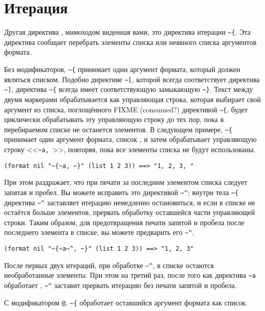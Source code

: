 \section{Итерация}

Другая директива , мимоходом виденная вами, это директива итерации
\lstinline!~{!. Эта директива сообщает  перебрать элементы списка или
  неявного списка аргументов формата.

Без модификаторов, \lstinline!~{! принимает один аргумент формата, который должен являться списком. Подобно директиве
\lstinline!~[!, которой всегда соответствует директива \lstinline!~]!, директива \lstinline!~{! всегда имеет соответствующую замыкающую
\lstinline!~}!. Текст между двумя маркерами обрабатывается как управляющая строка, которая выбирает свой аргумент из
списка, поглощённого FIXME (consumed?)  директивой \lstinline!~{!.  будет циклически обрабатывать эту
управляющую строку до тех пор, пока в перебираемом списке не останется элементов. В следующем примере, \lstinline!~{!
принимает один аргумент формата, список , и затем обрабатывает управляющую строку <<\lstinline!~a, !>>, повторяя,
пока все элементы списка не будут использованы.

\begin{lstlisting}[style=lisprepl]
  (format nil "~{~a, ~}" (list 1 2 3)) ==> "1, 2, 3, "
\end{lstlisting}

При этом раздражает, что при печати за последним элементом списка следует запятая и пробел. Вы можете исправить
это директивой \lstinline!~^!; внутри тела \lstinline!~{! директива \lstinline!~^! заставляет итерацию немедленно остановиться, и если в
списке не остаётся больше элементов, прервать обработку оставшейся части управляющей строки. Таким образом, для
предотвращения печати запятой и пробела после последнего элемента в списке, вы можете предварить его \lstinline!~^!.

\begin{lstlisting}[style=lisprepl]
  (format nil "~{~a~^, ~}" (list 1 2 3)) ==> "1, 2, 3"
\end{lstlisting}

После первых двух итераций, при обработке \lstinline!~^!, в списке остаются необработанные
элементы. При этом на третий раз, после того как директива \lstinline!~a! обработает
, \lstinline!~^! заставит  прервать итерацию без печати запятой и
пробела.

С модификатором \lstinline!@!, \lstinline!~{! обработает оставшийся аргумент формата как список.

